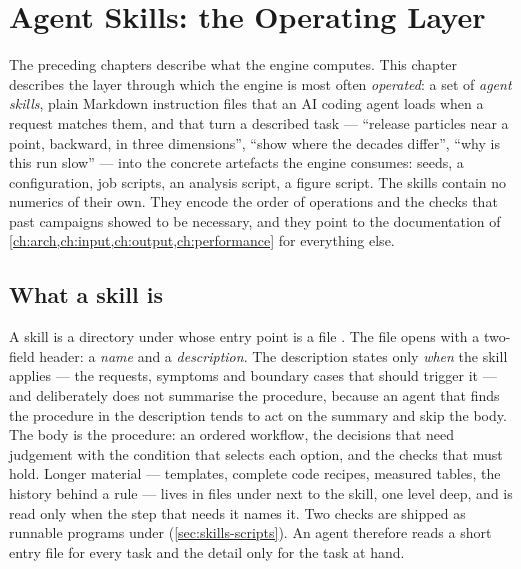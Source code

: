 \chapter{Agent Skills: the Operating Layer}\label{ch:skills}

The preceding chapters describe what the engine computes. This chapter describes the layer
through which the engine is most often \emph{operated}: a set of \emph{agent skills}, plain
Markdown instruction files that an AI coding agent loads when a request matches them, and that
turn a described task --- ``release particles near a point, backward, in three dimensions'',
``show where the decades differ'', ``why is this run slow'' --- into the concrete artefacts the
engine consumes: seeds, a configuration, job scripts, an analysis script, a figure script. The
skills contain no numerics of their own. They encode the order of operations and the checks that
past campaigns showed to be necessary, and they point to the documentation of
\cref{ch:arch,ch:input,ch:output,ch:performance} for everything else.

\section{What a skill is}\label{sec:skills-what}

A skill is a directory under  whose entry point is a file
. The file opens with a two-field header: a \emph{name} and a
\emph{description}. The description states only \emph{when} the skill applies --- the requests,
symptoms and boundary cases that should trigger it --- and deliberately does not summarise the
procedure, because an agent that finds the procedure in the description tends to act on the
summary and skip the body. The body is the procedure: an ordered workflow, the decisions that need
judgement with the condition that selects each option, and the checks that must hold. Longer
material --- templates, complete code recipes, measured tables, the history behind a rule --- lives
in files under  next to the skill, one level deep, and is read only when the
step that needs it names it. Two checks are shipped as runnable programs under 
(\cref{sec:skills-scripts}). An agent therefore reads a short entry file for every task and the
detail only for the task at hand.


